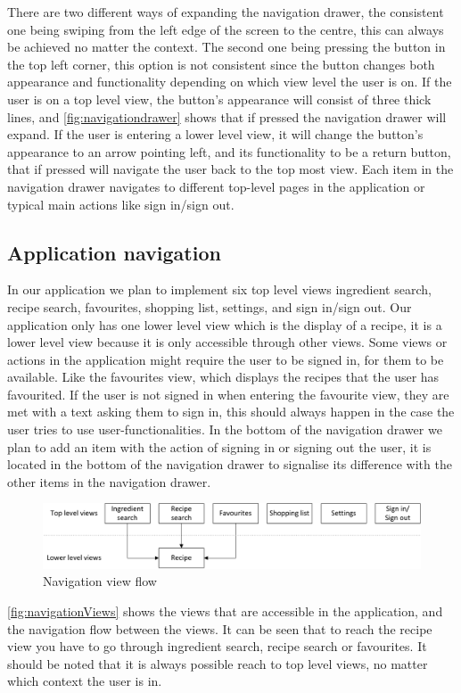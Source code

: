 There are two different ways of expanding the navigation drawer, the consistent one being swiping from the left edge of the screen to the centre, this can always be achieved no matter the context. 
The second one being pressing the button in the top left corner, this option is not consistent since the button changes both appearance and functionality depending on which view level the user is on. 
If the user is on a top level view, the button's appearance will consist of three thick lines, and \autoref{fig:navigationdrawer} shows that if pressed the navigation drawer will expand.
If the user is entering a lower level view, it will change the button's appearance to an arrow pointing left, and its functionality to be a return button, that if pressed will navigate the user back to the top most view. 
Each item in the navigation drawer navigates to different top-level pages in the application or typical main actions like sign in/sign out.

\subsection{Application navigation}
In our application we plan to implement six top level views ingredient search, recipe search, favourites, shopping list, settings, and sign in/sign out. 
Our application only has one lower level view which is the display of a recipe, it is a lower level view because it is only accessible through other views.
Some views or actions in the application might require the user to be signed in, for them to be available. 
Like the favourites view, which displays the recipes that the user has favourited.
If the user is not signed in when entering the favourite view, they are met with a text asking them to sign in, this should always happen in the case the user tries to use user-functionalities. 
In the bottom of the navigation drawer we plan to add an item with the action of signing in or signing out the user, it is located in the bottom of the navigation drawer to signalise its difference with the other items in the navigation drawer.
\begin{figure}[H]
\centering
\includegraphics[width=1.0\linewidth]{img/navigation.pdf}
\caption{Navigation view flow}
\label{fig:navigationViews}
\end{figure}
\autoref{fig:navigationViews} shows the views that are accessible in the application, and the navigation flow between the views. 
It can be seen that to reach the recipe view you have to go through ingredient search, recipe search or favourites. It should be noted that it is always possible reach to top level views, no matter which context the user is in.
